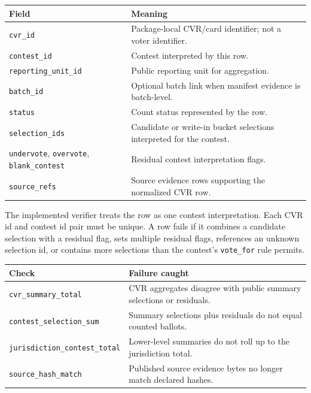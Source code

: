 \begin{center}
\small
\begin{tabularx}{\textwidth}{lX}
\toprule
Field & Meaning \\
\midrule
\texttt{cvr\_id} & Package-local CVR/card identifier; not a voter identifier. \\
\texttt{contest\_id} & Contest interpreted by this row. \\
\texttt{reporting\_unit\_id} & Public reporting unit for aggregation. \\
\texttt{batch\_id} & Optional batch link when manifest evidence is batch-level. \\
\texttt{status} & Count status represented by the row. \\
\texttt{selection\_ids} & Candidate or write-in bucket selections interpreted for the contest. \\
\texttt{undervote}, \texttt{overvote}, \texttt{blank\_contest} & Residual contest interpretation flags. \\
\texttt{source\_refs} & Source evidence rows supporting the normalized CVR row. \\
\bottomrule
\end{tabularx}
\end{center}

The implemented verifier treats the row as one contest interpretation. Each
CVR id and contest id pair must be unique. A row fails if it combines a
candidate selection with a residual flag, sets multiple residual flags,
references an unknown selection id, or contains more selections than the
contest's \texttt{vote\_for} rule permits.

\begin{center}
\small
\begin{tabularx}{\textwidth}{lX}
\toprule
Check & Failure caught \\
\midrule
\texttt{cvr\_summary\_total} & CVR aggregates disagree with public summary selections or residuals. \\
\texttt{contest\_selection\_sum} & Summary selections plus residuals do not equal counted ballots. \\
\texttt{jurisdiction\_contest\_total} & Lower-level summaries do not roll up to the jurisdiction total. \\
\texttt{source\_hash\_match} & Published source evidence bytes no longer match declared hashes. \\
\bottomrule
\end{tabularx}
\end{center}
